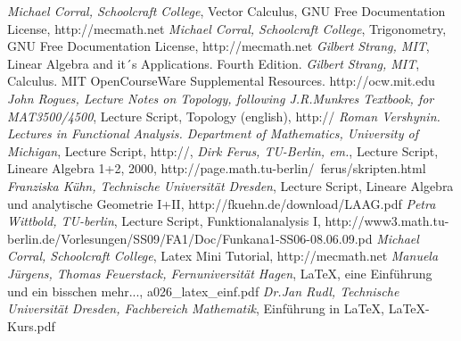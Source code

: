 \documentclass[a4paper]{article}
\begin{document}
\begin{thebibliography}
    \textit{Michael Corral, Schoolcraft College},
        Vector Calculus, GNU Free Documentation License, http://mecmath.net
     \textit{Michael Corral, Schoolcraft College},
        Trigonometry, GNU Free Documentation License, http://mecmath.net 
     \textit{Gilbert Strang, MIT},
            Linear Algebra and it´s Applications. Fourth Edition.        
     \textit{Gilbert Strang, MIT},
            Calculus. MIT OpenCourseWare Supplemental Resources. http://ocw.mit.edu    
     \textit{John Rogues, Lecture Notes on Topology, following J.R.Munkres Textbook, for MAT3500/4500},
            Lecture Script, Topology (english), http://
     \textit{Roman Vershynin. Lectures in Functional Analysis. Department of Mathematics, University of Michigan},
            Lecture Script, http://,        
     \textit{Dirk Ferus, TU-Berlin, em.},
            Lecture Script, Lineare Algebra 1+2, 2000, http://page.math.tu-berlin/~ferus/skripten.html
     \textit{Franziska K\"uhn, Technische Universit\"at Dresden},
            Lecture Script, Lineare Algebra und analytische Geometrie I+II, http://fkuehn.de/download/LAAG.pdf
     \textit{Petra Wittbold, TU-berlin},  
            Lecture Script, Funktionalanalysis I,  http://www3.math.tu-berlin.de/Vorlesungen/SS09/FA1/Doc/Funkana1-SS06-08.06.09.pd
     \textit{Michael Corral, Schoolcraft College},
            Latex Mini Tutorial, http://mecmath.net                    
     \textit{Manuela J\"urgens, Thomas Feuerstack, Fernuniversit\"at Hagen},
            LaTeX, eine Einf\"uhrung und ein bisschen mehr..., a026\_latex\_einf.pdf            
     \textit{Dr.Jan Rudl, Technische Universit\"at Dresden, Fachbereich Mathematik},
            Einf\"uhrung in LaTeX, LaTeX-Kurs.pdf

            \end{thebibliography}



\printindex
\end{document}
